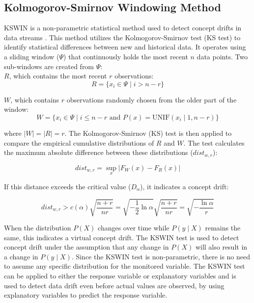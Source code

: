 \documentclass[pdflatex,sn-mathphys-ay]{sn-jnl}%
\theoremstyle{thmstyleone}%
\theoremstyle{thmstyletwo}%
\theoremstyle{thmstylethree}%
\begin{document}
\subsection{Kolmogorov-Smirnov Windowing Method}
KSWIN is a non-parametric statistical method used to detect concept drifts in data streams \citep{raab_2020}. This method utilizes the Kolmogorov-Smirnov test (KS test) to identify statistical differences between new and historical data. It operates using a sliding window (\(\Psi\)) that continuously holds the most recent \(n\) data points. Two sub-windows are created from \(\Psi\):\\


\noindent \(R\), which contains the most recent \(r\) observations:
\begin{equation}
    R = \{x_i \in \Psi \mid i > n - r\}
\end{equation}

\noindent \(W\), which contains \(r\) observations randomly chosen from the older part of the window:
\begin{equation}
    W = \{x_i \in \Psi \mid i \leq n - r \text{ and } P(x) = \text{UNIF}(x_i \mid 1, n - r)\}
\end{equation}

\noindent where \(|W| = |R| = r\). The Kolmogorov-Smirnov (KS) test is then applied to compare the empirical cumulative distributions of \(R\) and \(W\). The test calculates the maximum absolute difference between these distributions (\(dist_{w,r}\)):

\begin{equation}
dist_{w,r} = \sup_x \left| F_W(x) - F_R(x) \right|
\end{equation}

\noindent If this distance exceeds the critical value (\(D_\alpha\)), it indicates a concept drift:

\begin{equation}
dist_{w,r} > c(\alpha) \sqrt{\frac{n + r}{nr}} = \sqrt{-\frac{1}{2} \ln \alpha} \sqrt{\frac{n + r}{nr}} = \sqrt{-\frac{\ln \alpha}{r}}
\end{equation}

\noindent When the distribution \(P(X)\) changes over time while \(P(y \mid X)\) remains the same, this indicates a virtual concept drift. The KSWIN test is used to detect concept drift under the assumption that any change in \(P(X)\) will also result in a change in \(P(y \mid X)\). Since the KSWIN test is non-parametric, there is no need to assume any specific distribution for the monitored variable. The KSWIN test can be applied to either the response variable or explanatory variables and is used to detect data drift even before actual values are observed, by using explanatory variables to predict the response variable.
\end{document}
